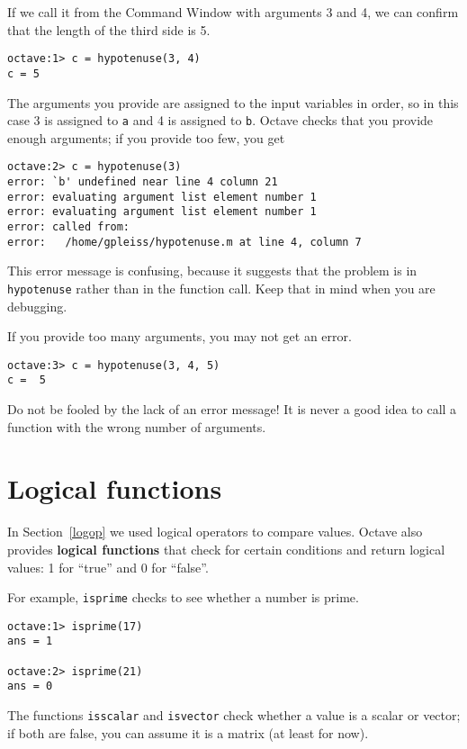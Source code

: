 If we call it from the Command Window with arguments 3 and 4, we can
confirm that the length of the third side is 5.

\begin{verbatim}
octave:1> c = hypotenuse(3, 4)
c = 5
\end{verbatim}

The arguments you provide are assigned to the input variables in
order, so in this case 3 is assigned to {\tt a} and 4 is assigned to
{\tt b}. Octave checks that you provide enough arguments;
if you provide too few, you get

\begin{verbatim}
octave:2> c = hypotenuse(3)
error: `b' undefined near line 4 column 21
error: evaluating argument list element number 1
error: evaluating argument list element number 1
error: called from:
error:   /home/gpleiss/hypotenuse.m at line 4, column 7
\end{verbatim}

This error message is confusing, because it suggests that
the problem is in {\tt hypotenuse} rather than in the function call.
Keep that in mind when you are debugging.

If you provide too many arguments, you may not get an error.

\begin{verbatim}
octave:3> c = hypotenuse(3, 4, 5)
c =  5
\end{verbatim}

Do not be fooled by the lack of an error message! It is never a good idea to
call a function with the wrong number of arguments.


\section{Logical functions}

In Section~\ref{logop} we used logical operators to compare values.
Octave also provides {\bf logical functions} that check for certain
conditions and return logical values: 1 for ``true'' and 0 for ``false''.

For example, {\tt isprime} checks to see whether a number is prime.

\begin{verbatim}
octave:1> isprime(17)
ans = 1

octave:2> isprime(21)
ans = 0
\end{verbatim}

The functions {\tt isscalar} and {\tt isvector} check whether
a value is a scalar or vector; if both are false, you can assume
it is a matrix (at least for now).

